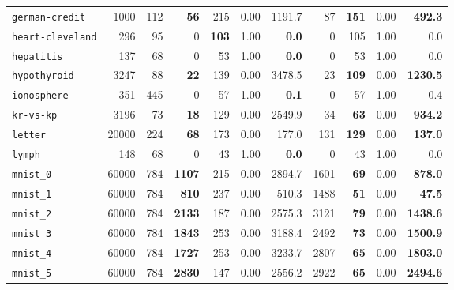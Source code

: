 \begin{tabular}{lccrrrrrrrr}
\texttt{german-credit} & \multicolumn{1}{r}{1000} & \multicolumn{1}{r}{112}  & \textbf{56} & 215 & 0.00 & 1191.7 & 87 & \textbf{151} & 0.00 & \textbf{492.3}\\
\texttt{heart-cleveland} & \multicolumn{1}{r}{296} & \multicolumn{1}{r}{95}  & 0 & \textbf{103} & 1.00 & \textbf{0.0} & 0 & 105 & 1.00 & 0.0\\
\texttt{hepatitis} & \multicolumn{1}{r}{137} & \multicolumn{1}{r}{68}  & 0 & 53 & 1.00 & \textbf{0.0} & 0 & 53 & 1.00 & 0.0\\
\texttt{hypothyroid} & \multicolumn{1}{r}{3247} & \multicolumn{1}{r}{88}  & \textbf{22} & 139 & 0.00 & 3478.5 & 23 & \textbf{109} & 0.00 & \textbf{1230.5}\\
\texttt{ionosphere} & \multicolumn{1}{r}{351} & \multicolumn{1}{r}{445}  & 0 & 57 & 1.00 & \textbf{0.1} & 0 & 57 & 1.00 & 0.4\\
\texttt{kr-vs-kp} & \multicolumn{1}{r}{3196} & \multicolumn{1}{r}{73}  & \textbf{18} & 129 & 0.00 & 2549.9 & 34 & \textbf{63} & 0.00 & \textbf{934.2}\\
\texttt{letter} & \multicolumn{1}{r}{20000} & \multicolumn{1}{r}{224}  & \textbf{68} & 173 & 0.00 & 177.0 & 131 & \textbf{129} & 0.00 & \textbf{137.0}\\
\texttt{lymph} & \multicolumn{1}{r}{148} & \multicolumn{1}{r}{68}  & 0 & 43 & 1.00 & \textbf{0.0} & 0 & 43 & 1.00 & 0.0\\
\texttt{mnist\_0} & \multicolumn{1}{r}{60000} & \multicolumn{1}{r}{784}  & \textbf{1107} & 215 & 0.00 & 2894.7 & 1601 & \textbf{69} & 0.00 & \textbf{878.0}\\
\texttt{mnist\_1} & \multicolumn{1}{r}{60000} & \multicolumn{1}{r}{784}  & \textbf{810} & 237 & 0.00 & 510.3 & 1488 & \textbf{51} & 0.00 & \textbf{47.5}\\
\texttt{mnist\_2} & \multicolumn{1}{r}{60000} & \multicolumn{1}{r}{784}  & \textbf{2133} & 187 & 0.00 & 2575.3 & 3121 & \textbf{79} & 0.00 & \textbf{1438.6}\\
\texttt{mnist\_3} & \multicolumn{1}{r}{60000} & \multicolumn{1}{r}{784}  & \textbf{1843} & 253 & 0.00 & 3188.4 & 2492 & \textbf{73} & 0.00 & \textbf{1500.9}\\
\texttt{mnist\_4} & \multicolumn{1}{r}{60000} & \multicolumn{1}{r}{784}  & \textbf{1727} & 253 & 0.00 & 3233.7 & 2807 & \textbf{65} & 0.00 & \textbf{1803.0}\\
\texttt{mnist\_5} & \multicolumn{1}{r}{60000} & \multicolumn{1}{r}{784}  & \textbf{2830} & 147 & 0.00 & 2556.2 & 2922 & \textbf{65} & 0.00 & \textbf{2494.6}\\

\end{tabular}
